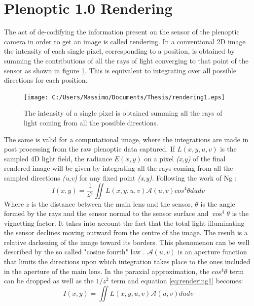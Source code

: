\section{Plenoptic 1.0 Rendering}
\label{sec:rendering1}
The act of de-codifying the information present on the sensor of the plenoptic camera in order to get an image is called rendering. 
In a conventional 2D image the intensity of each single pixel, corresponding to a position, is obtained by summing the contributions of all the rays of light converging to that point of the sensor \cite{georgiev2010focused} as shown in figure \ref{fig:render1}. This is equivalent to integrating over all possible directions for each position. 
\begin{figure}[H]
	\centering
	\texttt{[image: C:/Users/Massimo/Documents/Thesis/rendering1.eps]}
	\caption{\label{fig:render1} The intensity of a single pixel is obtained summing all the rays of light coming from all the possible directions.\cite{ng2006digital} }
\end{figure}
The same is valid for a computational image, where the integrations are made in post processing from the raw plenoptic data captured.
 If $L(x,y,u,v)$ is the sampled 4D light field, the radiance $E(x,y)$ on a pixel \textit{(x,y)} of the final rendered image will be given by integrating all the rays coming from all the sampled directions \textit{(u,v)} for any fixed point\textit{ (x,y)}. Following the work of Ng \cite{ng2006digital}:
\begin{equation}
\label{eq:rendering1}
I(x,y)=\dfrac{1}{z^2}\iint L(x,y,u,v)\mathscr{A}(u,v)cos^4\theta dudv
\end{equation} 
Where $z$ is the distance between the main lens and the sensor, $\theta$ is the angle formed by the rays and the sensor normal to the sensor surface and $\cos^4\theta$ is the vignetting factor. It takes into account the fact that the total light illuminating the sensor  declines moving outward  from  the  centre  of  the  image. The result is a relative darkening of the image toward 
its borders. This phenomenon can be well described by the so called "cosine fourth" law \cite{kerr2007derivation}. $\mathscr{A}(u,v)$ is an aperture function that limits the directions upon which integration takes place to the ones included in the aperture of the main lens. In the paraxial approximation, the $cos^4\theta$ term can be dropped as well as the $1/z^2$ term and equation \ref{eq:rendering1} becomes:
\begin{equation}
\label{eq:rendering2}
I(x,y)=\iint L(x,y,u,v)\mathscr{A}(u,v) dudv
\end{equation}
